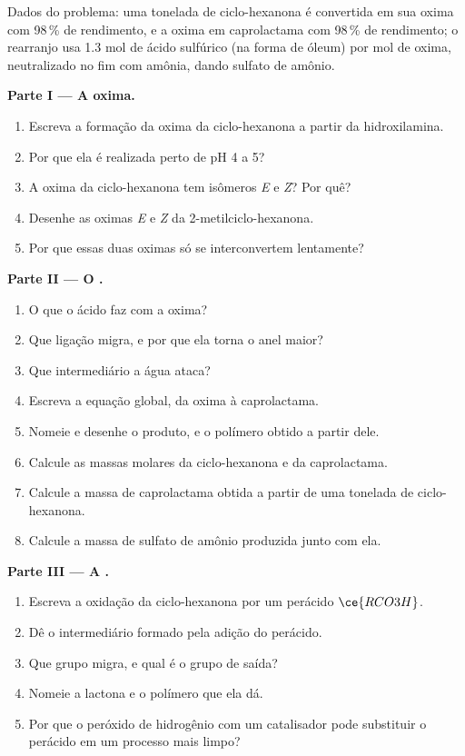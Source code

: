 \begin{problem}
\label{pb:b3:radicals-carbenes:1}
Dados do problema: uma tonelada de ciclo-hexanona é convertida em sua oxima com
98\,\% de rendimento, e a oxima em caprolactama com 98\,\% de rendimento; o rearranjo usa
1.3 mol de ácido sulfúrico (na forma de óleum) por mol de oxima, neutralizado no fim com
amônia, dando sulfato de amônio.

\medskip\noindent\textbf{Parte I --- A oxima.}
\begin{enumerate}
  \item Escreva a formação da oxima da ciclo-hexanona a partir da hidroxilamina.
  \item Por que ela é realizada perto de pH 4 a 5?
  \item A oxima da ciclo-hexanona tem isômeros \textit{E} e \textit{Z}? Por quê?
  \item Desenhe as oximas \textit{E} e \textit{Z} da 2-metilciclo-hexanona.
  \item Por que essas duas oximas só se interconvertem lentamente?
\end{enumerate}

\medskip\noindent\textbf{Parte II --- O .}
\begin{enumerate}[resume]
  \item O que o ácido faz com a oxima?
  \item Que ligação migra, e por que ela torna o anel maior?
  \item Que intermediário a água ataca?
  \item Escreva a equação global, da oxima à caprolactama.
  \item Nomeie e desenhe o produto, e o polímero obtido a partir dele.
  \item Calcule as massas molares da ciclo-hexanona e da caprolactama.
  \item Calcule a massa de caprolactama obtida a partir de uma tonelada de ciclo-hexanona.
  \item Calcule a massa de sulfato de amônio produzida junto com ela.
\end{enumerate}

\medskip\noindent\textbf{Parte III --- A .}
\begin{enumerate}[resume]
  \item Escreva a oxidação da ciclo-hexanona por um perácido $\ce{RCO3H}$.
  \item Dê o intermediário formado pela adição do perácido.
  \item Que grupo migra, e qual é o grupo de saída?
  \item Nomeie a lactona e o polímero que ela dá.
  \item Por que o peróxido de hidrogênio com um catalisador pode substituir o perácido em um
        processo mais limpo?
\end{enumerate}


\end{problem}
